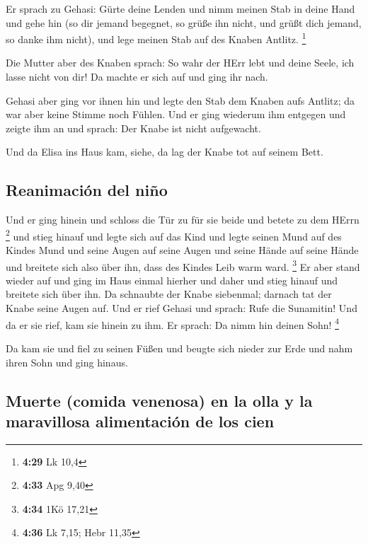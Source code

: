 Er sprach zu Gehasi: Gürte deine Lenden und nimm meinen
Stab in deine Hand und gehe hin (so dir jemand begegnet, so grüße ihn
nicht, und grüßt dich jemand, so danke ihm nicht), und lege meinen Stab
auf des Knaben Antlitz. \footnote{\textbf{4:29} Lk 10,4}

 Die Mutter aber des Knaben sprach: So wahr der HErr lebt
und deine Seele, ich lasse nicht von dir! Da machte er sich auf und ging
ihr nach.

 Gehasi aber ging vor ihnen hin und legte den Stab dem
Knaben aufs Antlitz; da war aber keine Stimme noch Fühlen. Und er ging
wiederum ihm entgegen und zeigte ihm an und sprach: Der Knabe ist nicht
aufgewacht.

 Und da Elisa ins Haus kam, siehe, da lag der Knabe tot
auf seinem Bett.

\hypertarget{reanimaciuxf3n-del-niuxf1o}{%
\subsection{Reanimación del niño}\label{reanimaciuxf3n-del-niuxf1o}}

 Und er ging hinein und schloss die Tür zu für sie beide
und betete zu dem HErrn \footnote{\textbf{4:33} Apg 9,40}
 und stieg hinauf und legte sich auf das Kind und legte
seinen Mund auf des Kindes Mund und seine Augen auf seine Augen und
seine Hände auf seine Hände und breitete sich also über ihn, dass des
Kindes Leib warm ward. \footnote{\textbf{4:34} 1Kö 17,21}
 Er aber stand wieder auf und ging im Haus einmal hierher
und daher und stieg hinauf und breitete sich über ihn. Da schnaubte der
Knabe siebenmal; darnach tat der Knabe seine Augen auf. 
Und er rief Gehasi und sprach: Rufe die Sunamitin! Und da er sie rief,
kam sie hinein zu ihm. Er sprach: Da nimm hin deinen Sohn! \footnote{\textbf{4:36}
  Lk 7,15; Hebr 11,35}

 Da kam sie und fiel zu seinen Füßen und beugte sich
nieder zur Erde und nahm ihren Sohn und ging hinaus.

\hypertarget{muerte-comida-venenosa-en-la-olla-y-la-maravillosa-alimentaciuxf3n-de-los-cien}{%
\subsection{Muerte (comida venenosa) en la olla y la maravillosa
alimentación de los
cien}\label{muerte-comida-venenosa-en-la-olla-y-la-maravillosa-alimentaciuxf3n-de-los-cien}}

